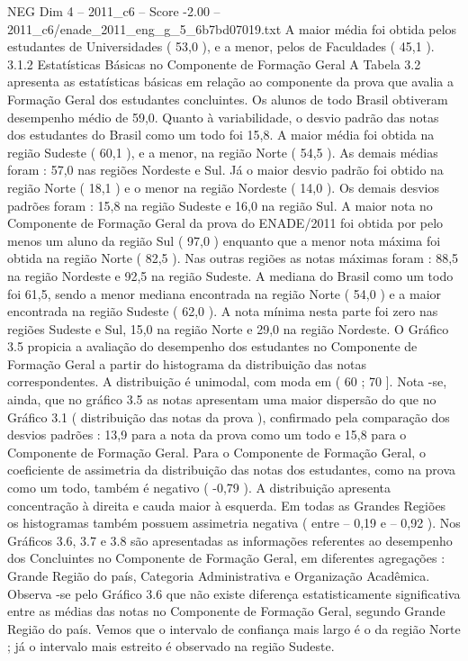 \begin{textsample}{NEG Dim 4 – 2011\_c6 – Score -2.00 – 2011\_c6/enade\_2011\_eng\_g\_5\_6b7bd07019.txt}
A maior média foi obtida pelos estudantes de Universidades ( 53,0 ), e a menor, pelos de Faculdades ( 45,1 ). 3.1.2 Estatísticas Básicas no Componente de Formação Geral A Tabela 3.2 apresenta as estatísticas básicas em relação ao componente da prova que avalia a Formação Geral dos estudantes concluintes.
Os alunos de todo Brasil obtiveram desempenho médio de 59,0.
Quanto à variabilidade, o desvio padrão das notas dos estudantes do Brasil como um todo foi 15,8.
A maior média foi obtida na região Sudeste ( 60,1 ), e a menor, na região Norte ( 54,5 ).
As demais médias foram : 57,0 nas regiões Nordeste e Sul.
Já o maior desvio padrão foi obtido na região Norte ( 18,1 ) e o menor na região Nordeste ( 14,0 ).
Os demais desvios padrões foram : 15,8 na região Sudeste e 16,0 na região Sul.
A maior nota no Componente de Formação Geral da prova do ENADE/2011 foi obtida por pelo menos um aluno da região Sul ( 97,0 ) enquanto que a menor nota máxima foi obtida na região Norte ( 82,5 ).
Nas outras regiões as notas máximas foram : 88,5 na região Nordeste e 92,5 na região Sudeste.
A mediana do Brasil como um todo foi 61,5, sendo a menor mediana encontrada na região Norte ( 54,0 ) e a maior encontrada na região Sudeste ( 62,0 ).
A nota mínima nesta parte foi zero nas regiões Sudeste e Sul, 15,0 na região Norte e 29,0 na região Nordeste.
O Gráfico 3.5 propicia a avaliação do desempenho dos estudantes no Componente de Formação Geral a partir do histograma da distribuição das notas correspondentes.
A distribuição é unimodal, com moda em ( 60 ; 70 ].
Nota -se, ainda, que no gráfico 3.5 as notas apresentam uma maior dispersão do que no Gráfico 3.1 ( distribuição das notas da prova ), confirmado pela comparação dos desvios padrões : 13,9 para a nota da prova como um todo e 15,8 para o Componente de Formação Geral.
Para o Componente de Formação Geral, o coeficiente de assimetria da distribuição das notas dos estudantes, como na prova como um todo, também é negativo ( -0,79 ).
A distribuição apresenta concentração à direita e cauda maior à esquerda.
Em todas as Grandes Regiões os histogramas também possuem assimetria negativa ( entre – 0,19 e – 0,92 ).
Nos Gráficos 3.6, 3.7 e 3.8 são apresentadas as informações referentes ao desempenho dos Concluintes no Componente de Formação Geral, em diferentes agregações : Grande Região do país, Categoria Administrativa e Organização Acadêmica.
Observa -se pelo Gráfico 3.6 que não existe diferença estatisticamente significativa entre as médias das notas no Componente de Formação Geral, segundo Grande Região do país.
Vemos que o intervalo de confiança mais largo é o da região Norte ; já o intervalo mais estreito é observado na região Sudeste.

\end{textsample}
